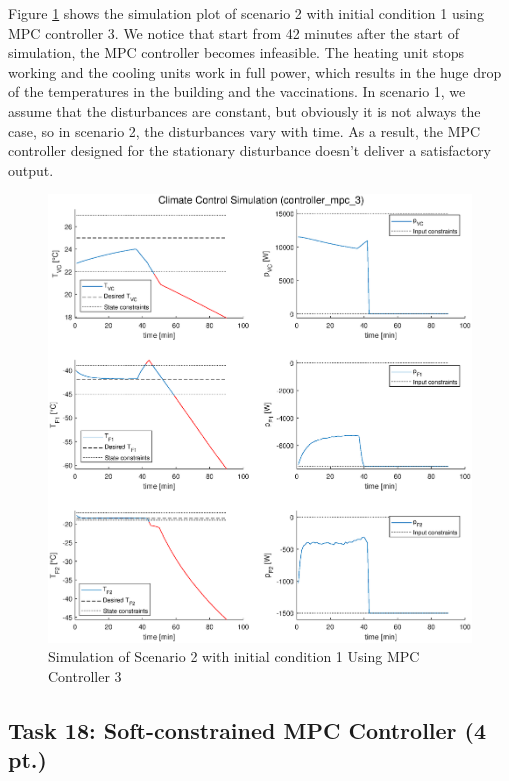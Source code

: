\documentclass[a4paper,twoside,11pt]{article}
\numberwithin{equation}{section}
\begin{document}
Figure \ref{fig:15} shows the simulation plot of scenario 2 with initial condition 1 using MPC controller 3. We notice that start from 42 minutes after the start of simulation, the MPC controller becomes infeasible. The heating unit stops working and the cooling units work in full power, which results in the huge drop of the temperatures in the building and the vaccinations. In scenario 1, we assume that the disturbances are constant, but obviously it is not always the case, so in scenario 2, the disturbances vary with time. As a result, the MPC controller designed for the stationary disturbance doesn't deliver a satisfactory output. 

\begin{figure}[ht]
\centering
\includegraphics[scale = 0.58]{image/17.eps}
\caption{Simulation of Scenario 2 with initial condition 1 Using MPC Controller 3}
\label{fig:15}
\end{figure}

\subsection{Task 18: Soft-constrained MPC Controller (4 pt.)}
\end{document}
